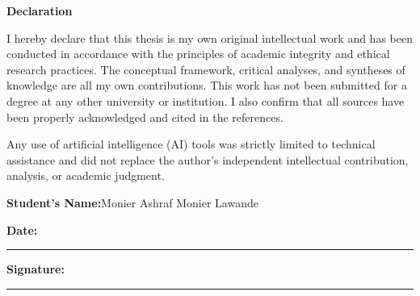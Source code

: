 \begingroup
\singlespacing
\begin{center}
{\fontsize{18}{24}\selectfont\bfseries Declaration}
\end{center}

\vspace{16bp}
\fontsize{12}{16}\selectfont
I hereby declare that this thesis is my own original intellectual work and
has been conducted in accordance with the principles of academic integrity
and ethical research practices.  The conceptual framework, critical
analyses, and syntheses of knowledge are all my own contributions.  This
work has not been submitted for a degree at any other university or
institution.  I also confirm that all sources have been properly
acknowledged and cited in the references.

Any use of artificial intelligence (AI) tools was strictly limited to
technical assistance and did not replace the author's independent
intellectual contribution, analysis, or academic judgment.

\vspace{16bp}
\noindent\textbf{Student's Name:}\enspace Monier Ashraf Monier Lawande

\vspace{10bp}
\noindent\textbf{Date:}\enspace\rule{0.40\textwidth}{0.4pt}

\vspace{10bp}
\noindent\textbf{Signature:}\enspace\rule{0.40\textwidth}{0.4pt}
\endgroup
